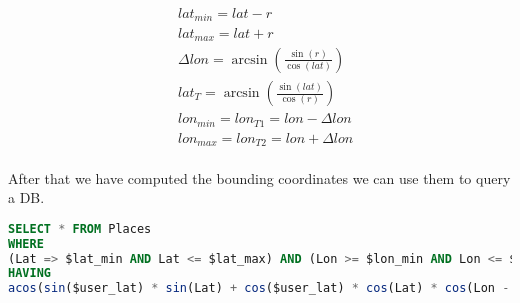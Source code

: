 \begin{eqnarray}
&lat_{min} = lat - r  \\
&lat_{max} = lat + r  \\
&\Delta lon = \arcsin(\frac{\sin(r)}{\cos(lat)})\\
&lat_T = \arcsin(  \frac{\sin(lat)} {\cos(r) }  )\\
&lon_{min} = lon_{T1} = lon - \Delta lon  \\
&lon_{max} = lon_{T2} = lon + \Delta lon 
\end{eqnarray}
\\
\noindent After that we have computed the bounding coordinates we can use them to query a DB.\\
\begin{lstlisting}[language=SQL]
SELECT * FROM Places 
WHERE 
(Lat => $lat_min AND Lat <= $lat_max) AND (Lon >= $lon_min AND Lon <= $lon_max )
HAVING
acos(sin($user_lat) * sin(Lat) + cos($user_lat) * cos(Lat) * cos(Lon - ($user_lon))) <= r;
\end{lstlisting}


